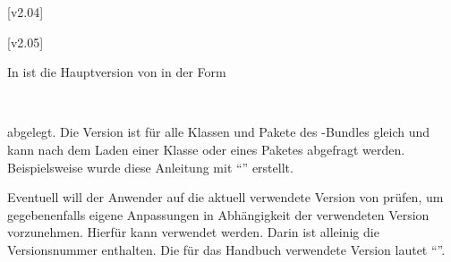 \begin{Declaration}
  {}
  [v2.04]
\begin{Declaration}
  {}
  [v2.05]
\printdeclarationlist

In  ist die Hauptversion von \TUDScript in der Form
\begin{quoting}
~~
\end{quoting}
abgelegt. Die Version ist für alle Klassen und Pakete des \TUDScript-Bundles
gleich und kann nach dem Laden einer Klasse oder eines Paketes abgefragt 
werden. Beispielsweise wurde diese Anleitung mit \enquote{\TUDScriptVersion{}} 
erstellt.

Eventuell will der Anwender auf die aktuell verwendete Version von \TUDScript 
prüfen, um gegebenenfalls eigene Anpassungen in Abhängigkeit der verwendeten 
Version vorzunehmen. Hierfür kann  verwendet 
werden. Darin ist alleinig die Versionsnummer enthalten. Die für das Handbuch 
verwendete Version lautet \enquote{\TUDScriptVersionNumber{}}.
\end{Declaration}
\end{Declaration}
